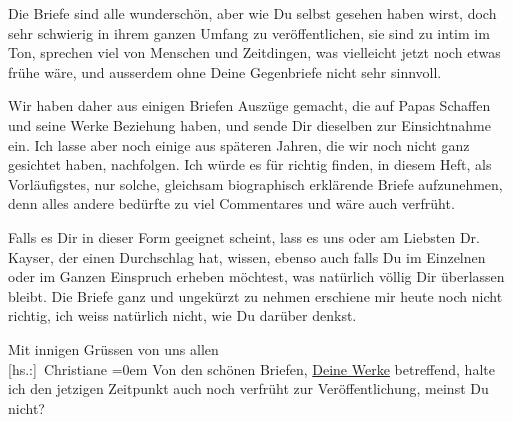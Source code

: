 \pstart
           Die Briefe sind alle wunderschön, aber wie Du selbst gesehen haben wirst, doch sehr
               schwierig in ihrem ganzen Umfang zu veröffentlichen, sie sind zu intim im Ton,
               sprechen viel von Menschen und Zeitdingen, was vielleicht jetzt noch etwas frühe
               wäre, und ausserdem ohne Deine Gegenbriefe nicht sehr sinnvoll.\pend
           
\pstart
           Wir haben daher aus einigen Briefen Auszüge gemacht, die auf Papas Schaffen und seine Werke Beziehung
               haben, und sende Dir dieselben zur Einsichtnahme ein. Ich lasse aber noch einige aus
               späteren Jahren, die wir noch nicht ganz gesichtet haben, nachfolgen. Ich würde es
               für richtig finden, in diesem Heft, als Vorläufigstes, nur solche, gleichsam
               biographisch erklärende Briefe aufzunehmen, denn alles andere bedürfte zu viel
               Commentares und wäre auch verfrüht.\pend
           
\pstart
           Falls es Dir in dieser Form geeignet scheint, lass es uns oder am Liebsten Dr. Kayser, der einen Durchschlag hat, wissen,
               ebenso auch falls Du im Einzelnen oder im Ganzen Einspruch erheben möchtest, was
               natürlich völlig Dir überlassen bleibt. Die Briefe ganz und ungekürzt zu nehmen
               erschiene mir heute noch nicht richtig, ich weiss natürlich nicht, wie Du darüber
               denkst.\pend
           
\pstart
           Mit innigen Grüssen von uns allen{\\[\baselineskip]}\spacefill\mbox{{[}hs.:{]} Christiane}\pend
           \leftskip=0em{}
\pstart
           \noindent{}{\pb}Von den schönen Briefen, \uline{Deine Werke} betreffend, halte ich den jetzigen
                  Zeitpunkt auch noch verfrüht zur Veröffentlichung, meinst Du nicht?\pend
           \endnumbering{}  \newcommand{\dateiname}{L02522}\newcommand{\titel}{Christiane Hofmannsthal an Arthur Schnitzler, 3. 9. 1929}\newcommand{\editorInnen}{Martin Anton Müller und Gerd-Hermann Susen}
